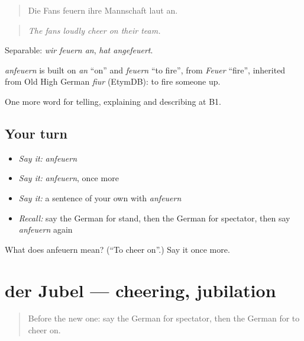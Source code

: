 \begin{quote}
Die Fans feuern ihre Mannschaft laut an.
\end{quote}

\begin{quote}
\emph{The fans loudly cheer on their team.}
\end{quote}

Separable: \emph{wir feuern an}, \emph{hat angefeuert}.

\begin{cousinweb}
\emph{anfeuern} is built on \emph{an} \textquotedblleft{}on\textquotedblright{} and \emph{feuern} \textquotedblleft{}to fire\textquotedblright{}, from \emph{Feuer} \textquotedblleft{}fire\textquotedblright{}, inherited from Old High German \emph{fiur} (EtymDB): to fire someone up.
\end{cousinweb}

\begin{grammarlens}[title={What you've built}]
One more word for telling, explaining and describing at B1.
\end{grammarlens}

\subsection*{Your turn}
\begin{itemize}
\raggedright
  \item \emph{Say it:} \emph{anfeuern}
  \item \emph{Say it:} \emph{anfeuern}, once more
  \item \emph{Say it:} a sentence of your own with \emph{anfeuern}
  \item \emph{Recall:} say the German for stand, then the German for spectator, then say \emph{anfeuern} again
\end{itemize}

\begin{tcolorbox}[breakable,colback=teal!4,colframe=teal!35!black,title={Before you move on}]
What does anfeuern mean? (\textquotedblleft{}To cheer on\textquotedblright{}.) Say it once more.
\end{tcolorbox}
\section[der Jubel]{der Jubel — cheering, jubilation}

\label{lesson:GE-C510-jubel}



\begin{quote}
Before the new one: say the German for spectator, then the German for to cheer on.
\end{quote}

